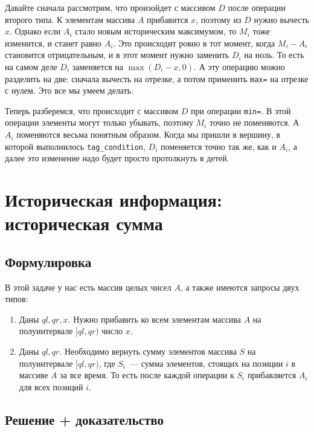 Давайте сначала рассмотрим, что произойдет с массивом $D$ после операции второго типа. К элементам массива $A$ прибавится $x$, поэтому из $D$ нужно вычесть $x$. Однако если $A_i$ стало новым историческим максимумом, то $M_i$ тоже изменится, и станет равно $A_i$. Это происходит ровно в тот момент, когда $M_i - A_i$ становится отрицательным, и в этот момент нужно заменить $D_i$ на ноль. То есть на самом деле $D_i$ заменяется на $\max(D_i - x, 0)$. А эту операцию можно разделить на две: сначала вычесть на отрезке, а потом применить \verb+max=+ на отрезке с нулем. Это все мы умеем делать.

Теперь разберемся, что происходит с массивом $D$ при операции \verb+min=+. В этой операции элементы могут только убывать, поэтому $M_i$ точно не поменяются. А $A_i$ поменяются весьма понятным образом. Когда мы пришли в вершину, в которой выполнилось \verb+tag_condition+, $D_i$ поменяется точно так же, как и $A_i$, а далее это изменение надо будет просто протолкнуть в детей.





\cprotect \section{Историческая информация: историческая сумма}

\subsection{Формулировка}

В этой задаче у нас есть массив целых чисел $A$, а также имеются запросы двух типов:

\begin{enumerate}
    \item Даны $ql, qr, x$. Нужно прибавить ко всем элементам массива $A$ на полуинтервале $[ql, qr)$ число $x$.
    \item Даны $ql, qr$. Необходимо вернуть сумму элементов массива $S$ на полуинтервале $[ql, qr)$, где $S_i$~--- сумма элементов, стоящих на позиции $i$ в массиве $A$ за все время. То есть после каждой операции к $S_i$ прибавляется $A_i$ для всех позиций $i$.
\end{enumerate}

\subsection{Решение + доказательство}

